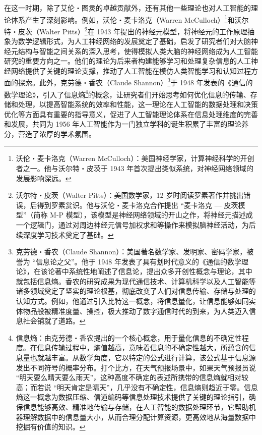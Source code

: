 在这一时期，除了艾伦・图灵的卓越贡献外，还有其他一些理论也对人工智能的理论体系产生了深刻影响。例如，沃伦・麦卡洛克（Warren McCulloch）\footnote{沃伦・麦卡洛克（Warren McCulloch）：美国神经学家，计算神经科学的开创者之一。他与沃尔特・皮茨于 1943 年首次提出类似系统，对神经网络领域的发展影响深远。}和沃尔特・皮茨（Walter Pitts）\footnote{沃尔特・皮茨（Walter Pitts）：美国数学家，12 岁时阅读罗素著作并挑出错误，后得到罗素赏识。他与沃伦・麦卡洛克合作提出 “麦卡洛克 — 皮茨模型”（简称 M-P 模型），该模型是神经网络领域的开山之作，将神经元描述成一个逻辑门，通过对周边神经元信号加权求和等操作来模拟脑神经活动，为后续深度学习技术奠定了基础。}在 1943 年提出的神经元模型，将神经元的工作原理抽象为数学逻辑形式，为人工神经网络的发展奠定了基础，启发了研究者们对大脑神经元结构与智能之间关系的深入思考，使得模拟人类大脑的神经网络成为人工智能研究的重要方向之一。他们的理论为后来者构建能够学习和处理复杂信息的人工神经网络提供了关键的理论支撑，推动了人工智能在模仿人类智能学习和认知过程方面的探索。此外，克劳德・香农（Claude Shannon）\footnote{克劳德・香农（Claude Shannon）：美国著名数学家、发明家、密码学家，被誉为 “信息论之父”。他于 1948 年发表了具有划时代意义的《通信的数学理论》，在该论著中系统性地阐述了信息论，提出众多开创性概念与理论，其中就包括信息熵。香农的研究成果为现代通信技术、计算机科学以及人工智能等诸多领域奠定了坚实的理论根基，彻底改变了人们对信息传输、存储与处理的认知方式。例如，他通过引入比特这一概念，将信息量化，让信息能够如同实体物品般被精准度量、操控，极大推动了数字通信时代的到来，为人类迈入信息社会铺就了道路。}于 1948 年发表的《通信的数学理论》，引入了信息熵\footnote{信息熵：由克劳德・香农提出的一个核心概念，用于量化信息的不确定性程度。在信息传输过程中，熵值越高，意味着信息的不确定性越大，所蕴含的信息量也就越丰富。从数学角度，它以特定的公式进行计算，该公式基于信息源发出不同符号的概率分布。打个比方，在天气预报场景中，如果天气预报员说 “明天要么晴天要么雨天”，这种高度不确定的表述所携带的信息熵就相对较高；而若说 “明天肯定是晴天”，几乎没有不确定性，信息熵则趋近于零。信息熵这一概念为数据压缩、信道编码等信息处理技术提供了关键的理论指引，确保信息能够高效、精准地传输与存储，在人工智能的数据处理环节，它帮助机器理解数据中的信息量大小，从而合理分配计算资源，更高效地从海量数据中挖掘有价值的知识。}的概念，让研究者们开始思考如何优化信息的传输、存储和处理，以提高智能系统的效率和性能，这一理论在人工智能的数据处理和决策优化等方面具有重要的指导意义，促进了人工智能理论体系在信息处理维度的完善和发展，共同为 1956 年人工智能作为一门独立学科的诞生积累了丰富的理论养分，营造了浓厚的学术氛围。


